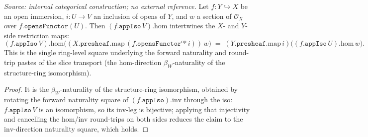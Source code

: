 \begin{lemma}\label{mk-lem:appiso_hom_naturality_apply}
  \leanok

  \textit{Source: internal categorical construction; no external reference.}
  Let \(f : Y \hookrightarrow X\) be an open immersion, \(i : U \to V\) an inclusion of opens of
  \(Y\), and \(w\) a section of \(\mathcal{O}_X\) over \(f.\mathtt{opensFunctor}(U)\). Then
  \((f.\mathtt{appIso}\,V).\mathrm{hom}\) intertwines the \(X\)- and \(Y\)-side restriction maps:
  \[
    (f.\mathtt{appIso}\,V).\mathrm{hom}\bigl(
      (X.\mathtt{presheaf}.\mathrm{map}\,(f.\mathtt{opensFunctor}^{\mathrm{op}}\,i))\,w\bigr)
      \;=\;
    (Y.\mathtt{presheaf}.\mathrm{map}\,i)\bigl((f.\mathtt{appIso}\,U).\mathrm{hom}\,w\bigr).
  \]
  This is the single ring-level square underlying the forward naturality and round-trip pastes
  of the slice transport (the \(\mathrm{hom}\)-direction \(\beta_W\)-naturality of the
  structure-ring isomorphism).
\end{lemma}
\begin{proof}
  \leanok


 It is the \(\beta_W\)-naturality of the structure-ring isomorphism,
  obtained by rotating the forward naturality square of \((f.\mathtt{appIso}).\mathrm{inv}\)
  through the iso: \(f.\mathtt{appIso}\,V\) is an isomorphism, so its \(\mathrm{inv}\)-leg is
  bijective; applying that injectivity and cancelling the \(\mathrm{hom}\)/\(\mathrm{inv}\)
  round-trips on both sides reduces the claim to the \(\mathrm{inv}\)-direction naturality
  square, which holds.
\end{proof}

